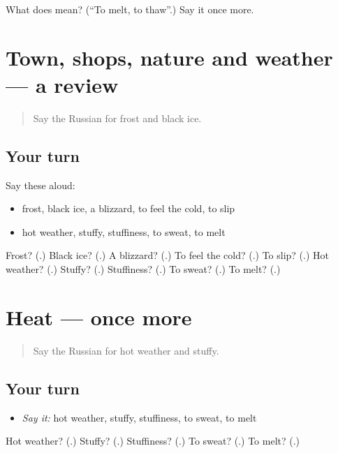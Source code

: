 \begin{tcolorbox}[breakable,colback=teal!4,colframe=teal!35!black,title={Before you move on}]
What does  mean? (\textquotedblleft{}To melt, to thaw\textquotedblright{}.) Say it once more.
\end{tcolorbox}
\section[(dialogue)]{Town, shops, nature and weather — a review}

\label{lesson:RU-R468-review-467-468}



\begin{quote}
Say the Russian for frost and black ice.
\end{quote}

\subsection*{Your turn}
Say these aloud:

\begin{itemize}
\raggedright
  \item frost, black ice, a blizzard, to feel the cold, to slip
  \item hot weather, stuffy, stuffiness, to sweat, to melt
\end{itemize}

\begin{tcolorbox}[breakable,colback=teal!4,colframe=teal!35!black,title={Before you move on}]
Frost? (\textbf{}.) Black ice? (\textbf{}.) A blizzard? (\textbf{}.) To feel the cold? (\textbf{}.) To slip? (\textbf{}.) Hot weather? (\textbf{}.) Stuffy? (\textbf{}.) Stuffiness? (\textbf{}.) To sweat? (\textbf{}.) To melt? (\textbf{}.)
\end{tcolorbox}
\section[(dialogue)]{Heat — once more}

\label{lesson:RU-R468-review-final-468}



\begin{quote}
Say the Russian for hot weather and stuffy.
\end{quote}

\subsection*{Your turn}
\begin{itemize}
\raggedright
  \item \emph{Say it:} hot weather, stuffy, stuffiness, to sweat, to melt
\end{itemize}

\begin{tcolorbox}[breakable,colback=teal!4,colframe=teal!35!black,title={Before you move on}]
Hot weather? (\textbf{}.) Stuffy? (\textbf{}.) Stuffiness? (\textbf{}.) To sweat? (\textbf{}.) To melt? (\textbf{}.)
\end{tcolorbox}
